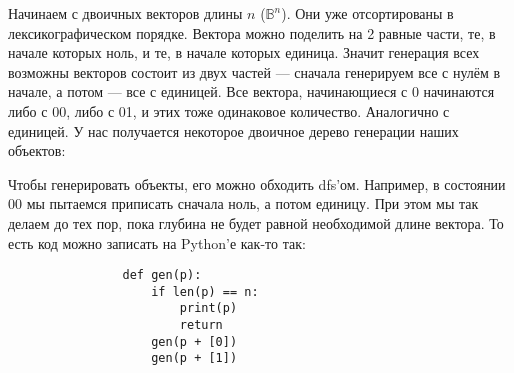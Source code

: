 \documentclass{article}
\begin{document}
\begin{itemize}
\begin{Comment}
            Начинаем с двоичных векторов длины $n$ ($\mathbb B^n$). Они уже отсортированы в лексикографическом порядке. Вектора можно поделить на 2 равные части, те, в начале которых ноль, и те, в начале которых единица. Значит генерация всех возможны векторов состоит из двух частей --- сначала генерируем все с нулём в начале, а потом --- все с единицей. Все вектора, начинающиеся с 0 начинаются либо с 00, либо с 01, и этих тоже одинаковое количество. Аналогично с единицей. У нас получается некоторое двоичное дерево генерации наших объектов:
            \begin{center}
            \end{center}
            Чтобы генерировать объекты, его можно обходить dfs'ом. Например, в состоянии 00 мы пытаемся приписать сначала ноль, а потом единицу. При этом мы так делаем до тех пор, пока глубина не будет равной необходимой длине вектора. То есть код можно записать на Python'е как-то так:
            \begin{verbatim}
                def gen(p):
                    if len(p) == n:
                        print(p)
                        return
                    gen(p + [0])
                    gen(p + [1])
                

\end{verbatim}
\end{Comment}
\end{itemize}
\end{document}

